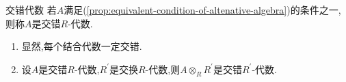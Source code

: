 \begin{definition}{交错代数}{}
	若$A$满足(\cref{prop:equivalent-condition-of-altenative-algebra})的条件之一,则称$A$是交错$R$-代数.
\end{definition}

\begin{remark}{}{}
	\begin{enumerate}
		\item 显然,每个结合代数一定交错.
		\item 设$A$是交错$R$-代数,$R^{\prime}$是交换$R$-代数,则$A\otimes_{R}R^{\prime}$是交错$R^{\prime}$-代数.
	\end{enumerate}
\end{remark}
















